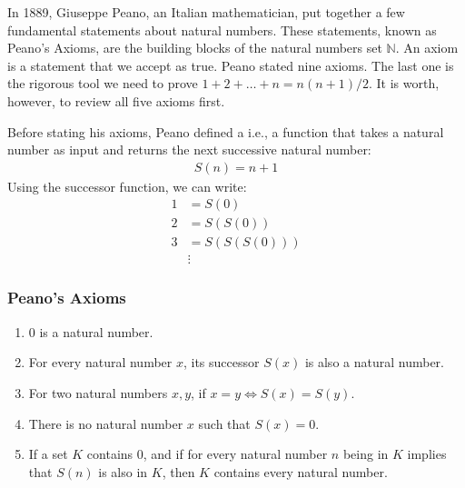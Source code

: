 \documentclass[letterpaper,10pt,english]{sphinxmanual}
\begin{document}
In 1889, Giuseppe Peano, an Italian mathematician, put together a few fundamental statements about natural numbers. These statements, known as Peano’s Axioms, are the building blocks of the natural numbers set \(\mathbb{N}\). An axiom is a statement that we accept as true. Peano stated nine axioms. The last one is the rigorous tool we need to prove \(1+2+\ldots+n = n(n+1)/2\). It is worth, however, to review all five axioms first.

Before stating his axioms, Peano defined a  i.e., a function that takes a natural number as input and returns the next successive natural number:
\begin{equation*}
\begin{split}S(n) = n+1\end{split}
\end{equation*}
Using the successor function, we can write:
\begin{equation*}
\begin{split}1 &= S(0) \\
2 &= S(S(0)) \\
3 &= S(S(S(0)))\\
&\vdots\end{split}
\end{equation*}

\subsubsection{Peano’s Axioms}
\label{\detokenize{COMP163/notes/induction:peano-s-axioms}}\begin{enumerate}
%
\item {} 
\(0\) is a natural number.

\item {} 
For every natural number \(x\), its successor \(S(x)\) is also a natural number.

\item {} 
For two natural numbers \(x, y\), if \(x=y \Leftrightarrow S(x)=S(y)\).

\item {} 
There is no natural number \(x\) such that \(S(x)=0\).

\item {} 
If a set \(K\) contains \(0\), and if for every natural number \(n\) being in \(K\) implies that \(S(n)\) is also in \(K\), then \(K\) contains every natural number.

\end{enumerate}
\end{document}
